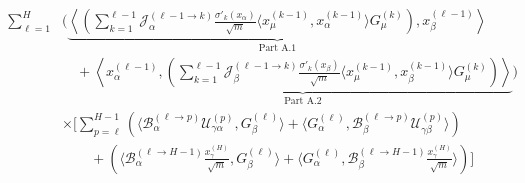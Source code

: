 \documentclass[11pt,a4paper]{article}
\theoremstyle{definition}
\begin{document}
\begin{align}
    \sum_{\ell=1}^{H} & \Biggl( \underbrace{\left\langle \left( \sum_{k=1}^{\ell-1} \mathcal{J}^{(\ell-1 \to k)}_{\alpha} \frac{\sigma'_{k}(x_\alpha)}{\sqrt{m}} \langle x^{(k-1)}_\mu, x^{(k-1)}_\alpha \rangle G^{(k)}_\mu \right), x^{(\ell-1)}_\beta \right\rangle}_{\text{Part A.1}} \nonumber \\
    & \quad + \underbrace{\left\langle x^{(\ell-1)}_\alpha, \left( \sum_{k=1}^{\ell-1} \mathcal{J}^{(\ell-1 \to k)}_{\beta} \frac{\sigma'_{k}(x_\beta)}{\sqrt{m}} \langle x^{(k-1)}_\mu, x^{(k-1)}_\beta \rangle G^{(k)}_\mu \right) \right\rangle}_{\text{Part A.2}} \Biggr) \nonumber \\
    & \times \Biggl[ \sum_{p=\ell}^{H-1} \left( \langle \mathcal{B}^{(\ell \to p)}_{\alpha} \mathcal{U}^{(p)}_{\gamma\alpha}, G^{(\ell)}_\beta \rangle + \langle G^{(\ell)}_\alpha, \mathcal{B}^{(\ell \to p)}_{\beta} \mathcal{U}^{(p)}_{\gamma\beta} \rangle \right) \nonumber \\
    & \qquad + \left( \langle \mathcal{B}^{(\ell \to H-1)}_{\alpha} \frac{x^{(H)}_\gamma}{\sqrt{m}}, G^{(\ell)}_\beta \rangle + \langle G^{(\ell)}_\alpha, \mathcal{B}^{(\ell \to H-1)}_{\beta} \frac{x^{(H)}_\gamma}{\sqrt{m}} \rangle \right) \Biggr]
    \end{align}
\end{document}
